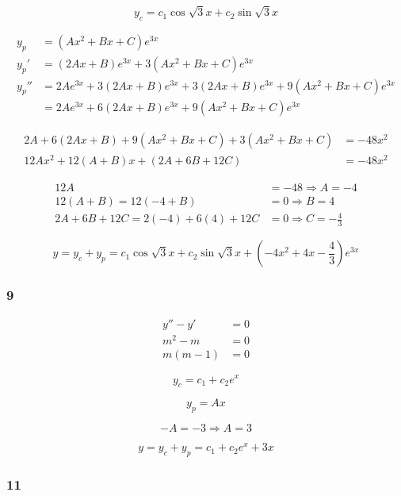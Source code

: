 \documentclass{article}
\begin{document}
\[y_c = c_1 \cos \sqrt{3} x + c_2 \sin \sqrt{3} x\]

\begin{align*}
  y_p   & = (Ax^2 + Bx + C) e^{3x}                                                         \\
  y_p'  & = (2Ax + B) e^{3x} + 3 (Ax^2 + Bx + C) e^{3x}                                    \\
  y_p'' & = 2A e^{3x} + 3 (2Ax + B) e^{3x} + 3 (2Ax + B) e^{3x} + 9 (Ax^2 + Bx + C) e^{3x} \\
        & = 2Ae^{3x} + 6 (2Ax + B) e^{3x} + 9 (Ax^2 + Bx + C) e^{3x}
\end{align*}

\begin{align*}
  2A + 6 (2Ax + B) + 9 (Ax^2 + Bx + C) + 3 (Ax^2 + Bx + C) & = -48 x^2 \\
  12Ax^2 + 12 (A + B) x + (2A + 6B + 12C)                  & = -48x^2
\end{align*}

\begin{align*}
  12A                                & = -48 \Rightarrow A = -4         \\
  12(A + B) = 12(-4 + B)             & = 0 \Rightarrow B = 4            \\
  2A + 6B + 12C = 2(-4) + 6(4) + 12C & = 0 \Rightarrow C = -\frac{4}{3}
\end{align*}

\[y = y_c + y_p = c_1 \cos \sqrt{3} x + c_2 \sin \sqrt{3} x + \left( -4x^2 + 4x - \frac{4}{3} \right) e^{3x}\]

\subsubsection{9}

\begin{align*}
  y'' - y'  & = 0 \\
  m^2 - m   & = 0 \\
  m (m - 1) & = 0
\end{align*}

\[y_c = c_1 + c_2 e^x\]

\[y_p = Ax\]

\[-A = -3 \Rightarrow A = 3\]

\[y = y_c + y_p = c_1 + c_2 e^x + 3x\]

\subsubsection{11}
\end{document}
